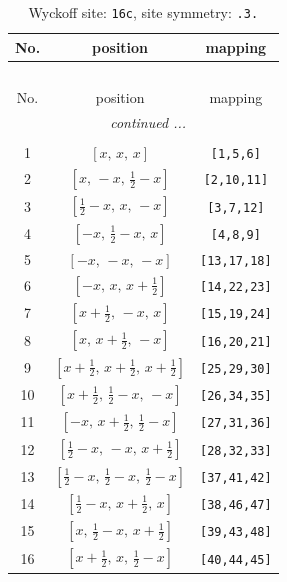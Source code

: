 \documentclass[fleqn,8pt]{jsarticle}
\begin{document}
\begin{longtable}{ccc}
\caption{Wyckoff site: {\tt 16c}, site symmetry: {\tt .3.}}
 \\
 \hline \hline
No. & position & mapping \\ \hline \endfirsthead

\multicolumn{2}{l}{\tablename\ \thetable{}} \\
 \hline \hline
No. & position & mapping \\ \hline \endhead

 \hline \hline
\multicolumn{2}{r}{\footnotesize\it continued ...} \\ \endfoot

 \hline \hline
\multicolumn{2}{r}{} \\ \endlastfoot

1 & $\left[ x,\, x,\, x \right]$ & {\tt [1,5,6]} \\ \hline
2 & $\left[ x,\, - x,\, \frac{1}{2} - x \right]$ & {\tt [2,10,11]} \\ \hline
3 & $\left[ \frac{1}{2} - x,\, x,\, - x \right]$ & {\tt [3,7,12]} \\ \hline
4 & $\left[ - x,\, \frac{1}{2} - x,\, x \right]$ & {\tt [4,8,9]} \\ \hline
5 & $\left[ - x,\, - x,\, - x \right]$ & {\tt [13,17,18]} \\ \hline
6 & $\left[ - x,\, x,\, x + \frac{1}{2} \right]$ & {\tt [14,22,23]} \\ \hline
7 & $\left[ x + \frac{1}{2},\, - x,\, x \right]$ & {\tt [15,19,24]} \\ \hline
8 & $\left[ x,\, x + \frac{1}{2},\, - x \right]$ & {\tt [16,20,21]} \\ \hline
9 & $\left[ x + \frac{1}{2},\, x + \frac{1}{2},\, x + \frac{1}{2} \right]$ & {\tt [25,29,30]} \\ \hline
10 & $\left[ x + \frac{1}{2},\, \frac{1}{2} - x,\, - x \right]$ & {\tt [26,34,35]} \\ \hline
11 & $\left[ - x,\, x + \frac{1}{2},\, \frac{1}{2} - x \right]$ & {\tt [27,31,36]} \\ \hline
12 & $\left[ \frac{1}{2} - x,\, - x,\, x + \frac{1}{2} \right]$ & {\tt [28,32,33]} \\ \hline
13 & $\left[ \frac{1}{2} - x,\, \frac{1}{2} - x,\, \frac{1}{2} - x \right]$ & {\tt [37,41,42]} \\ \hline
14 & $\left[ \frac{1}{2} - x,\, x + \frac{1}{2},\, x \right]$ & {\tt [38,46,47]} \\ \hline
15 & $\left[ x,\, \frac{1}{2} - x,\, x + \frac{1}{2} \right]$ & {\tt [39,43,48]} \\ \hline
16 & $\left[ x + \frac{1}{2},\, x,\, \frac{1}{2} - x \right]$ & {\tt [40,44,45]} \\
\end{longtable}
\end{document}
